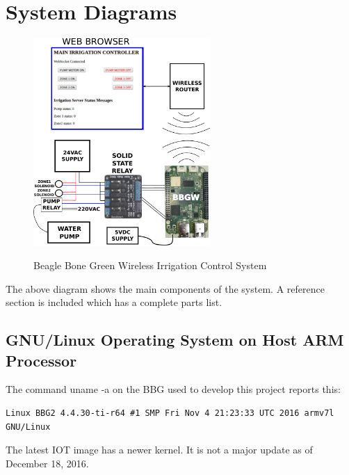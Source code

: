 %
%
%

\chapter{System Diagrams}

\begin{figure}[H]
	\centering
	\includegraphics[width=0.6\textwidth]{diagrams/system_diagram}
	\centering\bfseries
	\caption{Beagle Bone Green Wireless Irrigation Control System}
\end{figure}

The above diagram shows the main components of the system.  A reference section 
is included which has a complete parts list.


\section{GNU/Linux Operating System on Host ARM Processor}

The command uname -a on the BBG used to develop this project reports this:

\begin{verbatim}
Linux BBG2 4.4.30-ti-r64 #1 SMP Fri Nov 4 21:23:33 UTC 2016 armv7l GNU/Linux
\end{verbatim}

The latest IOT image has a newer kernel.  It is not a major update as of December 18, 2016.






